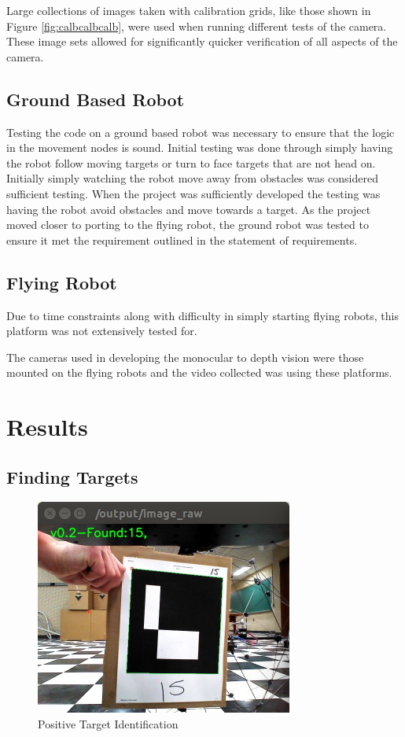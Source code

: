 \documentclass{article}[12]
\begin{document}
	Large collections of images taken with calibration grids, like those shown in Figure \ref{fig:calbcalbcalb}, were used when running different tests of the camera. These image sets allowed for significantly quicker verification of all aspects of the camera.
	
	\subsection{Ground Based Robot}
	
	Testing the code on a ground based robot was necessary to ensure that the logic in the movement nodes is sound. Initial testing was done through simply having the robot follow moving targets or turn to face targets that are not head on. Initially simply watching the robot move away from obstacles was considered sufficient testing. When the project was sufficiently developed the testing was having the robot avoid obstacles and move towards a target. As the project moved closer to porting to the flying robot, the ground robot was tested to ensure it met the requirement outlined in the statement of requirements. \cite{sor}

	\subsection{Flying Robot}
	
	Due to time constraints along with difficulty in simply starting flying robots, this platform was not extensively tested for. 
	
	The cameras used in developing the monocular to depth vision were those mounted on the flying robots and the video collected was using these platforms. 

	
\section{Results}

\subsection{Finding Targets}

\begin{figure}[H]
	\centering
	\includegraphics[width=0.45\linewidth]{resultsTarget}
	\caption{Positive Target Identification}
	\label{fig:targ}
\end{figure}
\end{document}
